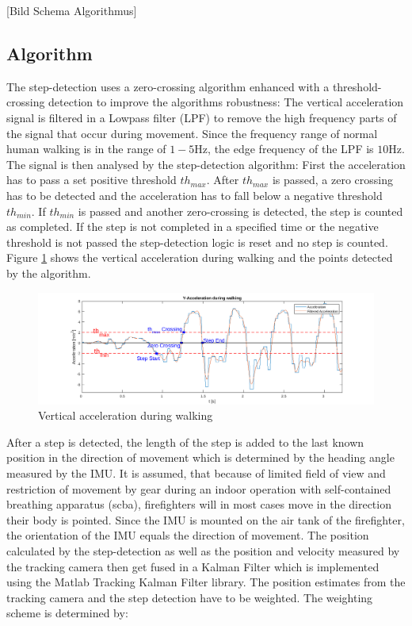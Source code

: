 \documentclass[engproc,conferenceproceedings,submit,pdftex,moreauthors]{Definitions/mdpi}
\begin{document}
[Bild Schema Algorithmus]


\subsection{Algorithm}
 The step-detection uses a zero-crossing algorithm enhanced with a threshold-crossing detection to improve the algorithms robustness: The vertical acceleration signal is filtered in a Lowpass filter (LPF) to remove the high frequency parts of the signal that occur during movement. Since the frequency range of normal human walking is in the range of $1-5\mathrm{Hz}$, the edge frequency of the LPF is $10 \mathrm{Hz}$. The signal is then analysed by the step-detection algorithm: First the acceleration has to pass a set positive threshold $th_{max}$. After $th_{max}$ is passed, a zero crossing has to be detected and the acceleration has to fall below a negative threshold $th_{min}$. If $th_{min}$ is passed and another zero-crossing is detected, the step is counted as completed. If the step is not completed in a specified time or the negative threshold is not passed the step-detection logic is reset and no step is counted. Figure \ref{fig:accelerationWalking} shows the vertical acceleration during walking and the points detected by the algorithm. 

\begin{figure}[h!]
	\centering
	\includegraphics[width=\textwidth]{Walk.png}
	
	\caption{Vertical acceleration during walking}
	\label{fig:accelerationWalking}
\end{figure}

After a step is detected, the length of the step is added to the last known position in the direction of movement which is determined by the heading angle measured by the IMU. It is assumed, that because of limited field of view and restriction of movement by gear during an indoor operation with self-contained breathing apparatus (scba), firefighters will in most cases move in the direction their body is pointed. Since the IMU is mounted on the air tank of the firefighter, the orientation of the IMU equals the direction of movement.
The position calculated by the step-detection as well as the position and velocity measured by the tracking camera then get fused in a Kalman Filter which is implemented using the Matlab Tracking Kalman Filter library.
The position estimates from the tracking camera and the step detection have to be weighted. The weighting scheme is determined by:
\end{document}
